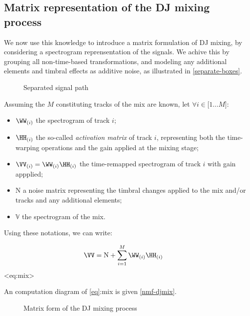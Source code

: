 \subsection{Matrix representation of the DJ mixing process}

We now use this knowledge to introduce a matrix formulation of DJ
mixing, by considering a spectrogram reprensentation of the signals. We
achive this by grouping all non-time-based transformations, and modeling
any additional elements and timbral effects as additive noise, as
illustrated in \hyperref[separate-boxes]{{[}separate-boxes{]}}.

\begin{figure}
\centering

\caption{Separated signal path}
\end{figure}

\label{separate-boxes}{}

Assuming the \(M\) constituting tracks of the mix are known, let
\(\forall i \in \lbrack 1\ldots M\rbrack\):

\begin{itemize}
\item
  \(\WW_{(i)}\) the spectrogram of track \(i\);
\item
  \(\HH_{(i)}\) the so-called \emph{activation matrix} of track
  \(i\), representing both the time-warping operations and the gain
  applied at the mixing stage;
\item
  \(\VV_{(i)} = \WW_{(i)}\HH_{(i)}\) the
  time-remapped spectrogram of track \(i\) with gain appplied;
\item
  \(\mathbf{\mathrm{N}}\) a noise matrix representing the timbral
  changes applied to the mix and/or tracks and any additional elements;
\item
  \(\mathbb{V}\) the spectrogram of the mix.
\end{itemize}

Using these notations, we can write:

\[\begin{aligned}
\VV & = \mathbf{\mathrm{N}} + \sum_{i = 1}^{M}\WW_{(i)}\HH_{(i)}
\end{aligned}\] \textless eq:mix\textgreater{}

An computation diagram of \hyperref[eq]{{[}eq{]}}:mix is given
\hyperref[nmf-djmix]{{[}nmf-djmix{]}}.

\begin{figure}
\centering

\caption{Matrix form of the DJ mixing process}
\end{figure}

